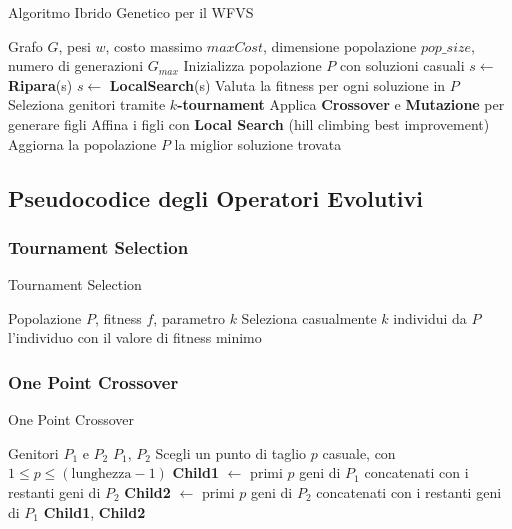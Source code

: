 \documentclass[a4paper,12pt]{article}
\begin{document}
\begin{algorithm}[H]
\caption{Algoritmo Ibrido Genetico per il WFVS}
\begin{algorithmic}[1]
\REQUIRE Grafo $G$, pesi $w$, costo massimo $maxCost$, dimensione popolazione $pop\_size$, numero di generazioni $G_{max}$
\STATE Inizializza popolazione $P$ con soluzioni casuali
    \STATE $s \gets$ \textbf{Ripara}(s)
    \STATE $s \gets$ \textbf{LocalSearch}(s)
\ENDFOR
{}
    \STATE Valuta la fitness per ogni soluzione in $P$
    \STATE Seleziona genitori tramite \textbf{$k$-tournament}
    \STATE Applica \textbf{Crossover} e \textbf{Mutazione} per generare figli
    \STATE Affina i figli con \textbf{Local Search} (hill climbing best improvement)
    \STATE Aggiorna la popolazione $P$
\ENDFOR
\RETURN la miglior soluzione trovata
\end{algorithmic}
\end{algorithm}

\subsection{Pseudocodice degli Operatori Evolutivi}

\subsubsection{Tournament Selection}
\begin{algorithm}[H]
\caption{Tournament Selection}
\begin{algorithmic}[1]
\REQUIRE Popolazione $P$, fitness $f$, parametro $k$
\STATE Seleziona casualmente $k$ individui da $P$
\STATE \RETURN l'individuo con il valore di fitness minimo
\end{algorithmic}
\end{algorithm}

\subsubsection{One Point Crossover}
\begin{algorithm}[H]
\caption{One Point Crossover}
\begin{algorithmic}[1]
\REQUIRE Genitori $P_1$ e $P_2$
    \RETURN $P_1$, $P_2$
\ENDIF
\STATE Scegli un punto di taglio $p$ casuale, con $1 \leq p \leq (\text{lunghezza} - 1)$
\STATE \textbf{Child1} $\gets$ primi $p$ geni di $P_1$ concatenati con i restanti geni di $P_2$
\STATE \textbf{Child2} $\gets$ primi $p$ geni di $P_2$ concatenati con i restanti geni di $P_1$
\RETURN \textbf{Child1}, \textbf{Child2}
\end{algorithmic}
\end{algorithm}
\end{document}
